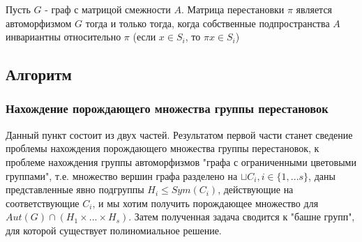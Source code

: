 \begin{lemma}
    Пусть $G$ - граф с матрицой смежности $A$. Матрица перестановки $\pi$ является автоморфизмом $G$ тогда и только тогда, когда собственные подпространства $A$ инвариантны относительно $\pi$ (если $x\in S_i$, то $\pi x \in S_i$)
\end{lemma}

\subsection*{Алгоритм}

\subsubsection*{Нахождение порождающего множества группы перестановок}
Данный пункт состоит из двух частей. Результатом первой части станет сведение проблемы нахождения порождающего множества группы перестановок, к проблеме нахождения группы автоморфизмов "графа с ограниченными цветовыми группами", т.е. множество вершин графа разделено на $\sqcup C_i, i \in \{1, ... s\}$, даны представленные явно подгруппы $H_i \leqslant Sym(C_i)$, действующие на соответствующие $C_i$, и мы хотим получить  порождающее множество для $Aut(G) \cap (H_1 \times ... \times H_s)$. Затем полученная задача сводится к "башне групп", для которой существует полиномиальное решение.

